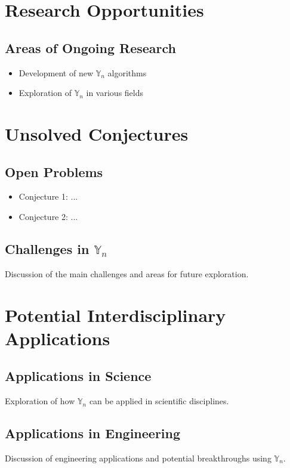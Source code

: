 \documentclass[12pt]{book}
\begin{document}
\section{Research Opportunities}
\subsection{Areas of Ongoing Research}
\begin{itemize}
    \item Development of new $\mathbb{Y}_n$ algorithms
    \item Exploration of $\mathbb{Y}_n$ in various fields
\end{itemize}

\section{Unsolved Conjectures}
\subsection{Open Problems}
\begin{itemize}
    \item Conjecture 1: ...
    \item Conjecture 2: ...
\end{itemize}
\subsection{Challenges in $\mathbb{Y}_n$}
Discussion of the main challenges and areas for future exploration.

\section{Potential Interdisciplinary Applications}
\subsection{Applications in Science}
Exploration of how $\mathbb{Y}_n$ can be applied in scientific disciplines.
\subsection{Applications in Engineering}
Discussion of engineering applications and potential breakthroughs using $\mathbb{Y}_n$.
\end{document}
